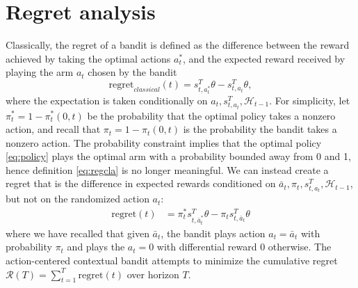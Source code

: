 \documentclass{article}
\begin{document}
\section{Regret analysis}
Classically, the regret of a bandit is defined as the difference between the reward achieved by taking the optimal actions $a^*_t$, and the expected reward received by playing the arm $a_t$ chosen by the bandit
\begin{equation}\label{eq:regcla}
\mathrm{regret}_{classical}(t) = s_{t,a^*_t}^T\theta - s_{t,a_t}^T \theta,
\end{equation}
where the expectation is taken conditionally on $a_t, s_{t,a_t}^T, \mathcal{H}_{t-1}$. 
For simplicity, let $\pi^*_t = 1-\pi^*_t(0,t)$ be the probability that the optimal policy takes a nonzero action, and recall that $\pi_t = 1-\pi_t(0,t)$ is the probability the bandit takes a nonzero action.
The probability constraint implies that the optimal policy \eqref{eq:policy} plays the optimal arm with a probability bounded away from 0 and 1, hence definition \eqref{eq:regcla} is no longer meaningful. We can instead create a regret that is the difference in expected rewards conditioned on $\bar{a}_t,\pi_t, s_{t,a_t}^T, \mathcal{H}_{t-1}$, but not on the randomized action $a_t$:
\begin{align}\label{eq:regret}
\mathrm{regret}(t) &=  \pi^*_t s_{t,\bar{a}^*_t}^T\theta - \pi_t s_{t,\bar{a}_t}^T \theta%
\end{align}
where we have recalled that given $\bar{a}_t$, the bandit plays action $a_t = \bar{a}_t$ with probability $\pi_t$ and plays the $a_t = 0$ with differential reward 0 otherwise.
The action-centered contextual bandit attempts to minimize the cumulative regret $
\mathcal{R}(T) = \sum\nolimits_{t = 1}^T \mathrm{regret}(t)
$ over horizon $T$.
\end{document}
